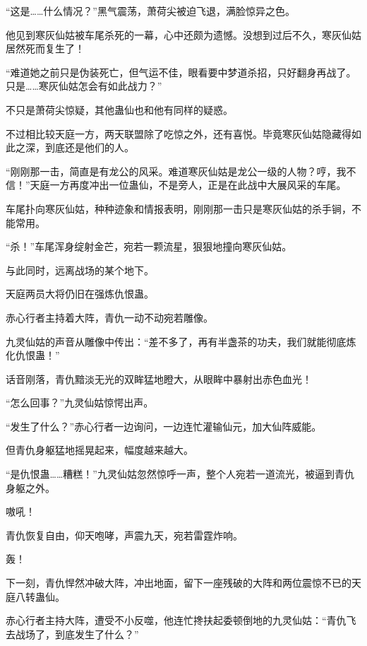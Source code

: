 
\begin{this_body}



“这是……什么情况？”黑气震荡，萧荷尖被迫飞退，满脸惊异之色。

他见到寒灰仙姑被车尾杀死的一幕，心中还颇为遗憾。没想到过后不久，寒灰仙姑居然死而复生了！

“难道她之前只是伪装死亡，但气运不佳，眼看要中梦道杀招，只好翻身再战了。只是……寒灰仙姑怎会有如此战力？”

不只是萧荷尖惊疑，其他蛊仙也和他有同样的疑惑。

不过相比较天庭一方，两天联盟除了吃惊之外，还有喜悦。毕竟寒灰仙姑隐藏得如此之深，到底还是他们的人。

“刚刚那一击，简直是有龙公的风采。难道寒灰仙姑是龙公一级的人物？哼，我不信！”天庭一方再度冲出一位蛊仙，不是旁人，正是在此战中大展风采的车尾。

车尾扑向寒灰仙姑，种种迹象和情报表明，刚刚那一击只是寒灰仙姑的杀手锏，不能常用。

“杀！”车尾浑身绽射金芒，宛若一颗流星，狠狠地撞向寒灰仙姑。

与此同时，远离战场的某个地下。

天庭两员大将仍旧在强炼仇恨蛊。

赤心行者主持着大阵，青仇一动不动宛若雕像。

九灵仙姑的声音从雕像中传出：“差不多了，再有半盏茶的功夫，我们就能彻底炼化仇恨蛊！”

话音刚落，青仇黯淡无光的双眸猛地瞪大，从眼眸中暴射出赤色血光！

“怎么回事？”九灵仙姑惊愕出声。

“发生了什么？”赤心行者一边询问，一边连忙灌输仙元，加大仙阵威能。

但青仇身躯猛地摇晃起来，幅度越来越大。

“是仇恨蛊……糟糕！”九灵仙姑忽然惊呼一声，整个人宛若一道流光，被逼到青仇身躯之外。

嗷吼！

青仇恢复自由，仰天咆哮，声震九天，宛若雷霆炸响。

轰！

下一刻，青仇悍然冲破大阵，冲出地面，留下一座残破的大阵和两位震惊不已的天庭八转蛊仙。

赤心行者主持大阵，遭受不小反噬，他连忙搀扶起委顿倒地的九灵仙姑：“青仇飞去战场了，到底发生了什么？”


\end{this_body}
